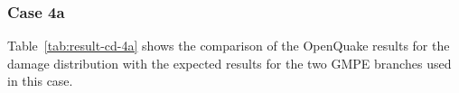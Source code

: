 \subsubsection{Case 4a}



Table~\ref{tab:result-cd-4a} shows the comparison of the OpenQuake results for the damage distribution with the expected results for the two GMPE branches used in this case.